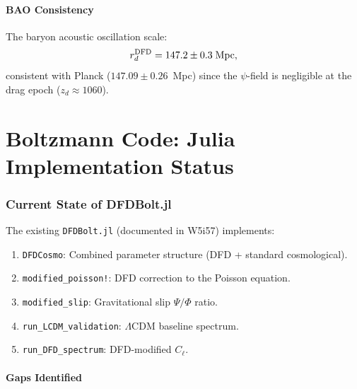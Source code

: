 \documentclass[11pt,a4paper]{article}
\theoremstyle{remark}
\begin{document}
\subsection{BAO Consistency}

The baryon acoustic oscillation scale:
\begin{equation}
r_d^{\rm DFD} = 147.2 \pm 0.3\;\text{Mpc},
\end{equation}
consistent with Planck ($147.09 \pm 0.26$~Mpc) since the $\psi$-field is
negligible at the drag epoch ($z_d \approx 1060$).


\newpage
\part{Boltzmann Code: Julia Implementation Status}
\label{part:julia}

\section{Current State of DFDBolt.jl}

The existing \texttt{DFDBolt.jl} (documented in W5i57) implements:
\begin{enumerate}
\item \texttt{DFDCosmo}: Combined parameter structure (DFD + standard cosmological).
\item \texttt{modified\_poisson!}: DFD correction to the Poisson equation.
\item \texttt{modified\_slip}: Gravitational slip $\Psi/\Phi$ ratio.
\item \texttt{run\_LCDM\_validation}: $\Lambda$CDM baseline spectrum.
\item \texttt{run\_DFD\_spectrum}: DFD-modified $C_\ell$.
\end{enumerate}

\subsection{Gaps Identified}
\end{document}
